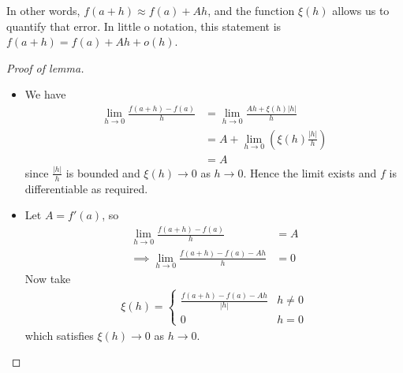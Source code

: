 \documentclass{../template/note}
\begin{document}
    \begin{remark*}
        In other words, \(f(a+h) \approx f(a) + Ah\), and the function \(\xi(h)\) allows us to quantify that error. In little o notation, this statement is \(f(a+h) = f(a) + Ah + o(h)\).
    \end{remark*}
    
    \begin{proof}[Proof of lemma]
        \begin{itemize}
            \item[\(\impliedby\)] We have
            \begin{align*}
                \lim_{h \to 0} \frac{f(a+h)-f(a)}h &= \lim_{h \to 0}\frac{Ah + \xi(h) |h|}{h} \\
                &= A + \lim_{h \to 0} \left(\xi(h) \frac{|h|}{h}\right) \\
                &= A
            \end{align*}
            since \(\frac{|h|}{h}\) is bounded and \(\xi(h) \to 0\) as \(h \to 0\). Hence the limit exists and \(f\) is differentiable as required.
            \item[\(\implies\)] Let \(A = f'(a)\), so
            \begin{align*}
                \lim_{h \to 0} \frac{f(a+h)-f(a)}{h} &= A \\
                \implies \lim_{h \to 0} \frac{f(a+h)-f(a)-Ah}{h} &= 0
            \end{align*}
            Now take
            \begin{align*}
                \xi(h) = \begin{cases}
                    \frac{f(a+h)-f(a)-Ah}{|h|} & h \neq 0 \\
                    0 & h = 0
                \end{cases}
            \end{align*}
            which satisfies \(\xi(h) \to 0\) as \(h \to 0\).
        \end{itemize}
    \end{proof}
    
\end{document}
